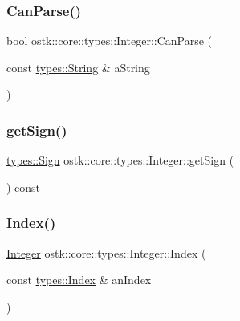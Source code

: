\subsubsection{\texorpdfstring{Can\+Parse()}{CanParse()}\hspace{0.1cm}{\footnotesize\ttfamily [2/2]}}
{\footnotesize\ttfamily bool ostk\+::core\+::types\+::\+Integer\+::\+Can\+Parse (\begin{DoxyParamCaption}\item[{const \hyperlink{classostk_1_1core_1_1types_1_1_string}{types\+::\+String} \&}]{a\+String }\end{DoxyParamCaption})\hspace{0.3cm}{\ttfamily [static]}}

\mbox{\label{classostk_1_1core_1_1types_1_1_integer_adcc2438b943d15638872beccea9dc297}} 
\subsubsection{\texorpdfstring{get\+Sign()}{getSign()}}
{\footnotesize\ttfamily \hyperlink{namespaceostk_1_1core_1_1types_ae10e15cf66b50aaec17f4f78c984d7bf}{types\+::\+Sign} ostk\+::core\+::types\+::\+Integer\+::get\+Sign (\begin{DoxyParamCaption}{ }\end{DoxyParamCaption}) const}

\mbox{\label{classostk_1_1core_1_1types_1_1_integer_ab5a9b95491555d7527e233bf8e1a7b38}} 
\subsubsection{\texorpdfstring{Index()}{Index()}}
{\footnotesize\ttfamily \hyperlink{classostk_1_1core_1_1types_1_1_integer}{Integer} ostk\+::core\+::types\+::\+Integer\+::\+Index (\begin{DoxyParamCaption}\item[{const \hyperlink{namespaceostk_1_1core_1_1types_a6e63c1b15b2e5bc87a43771c09fa913a}{types\+::\+Index} \&}]{an\+Index }\end{DoxyParamCaption})\hspace{0.3cm}{\ttfamily [static]}}

